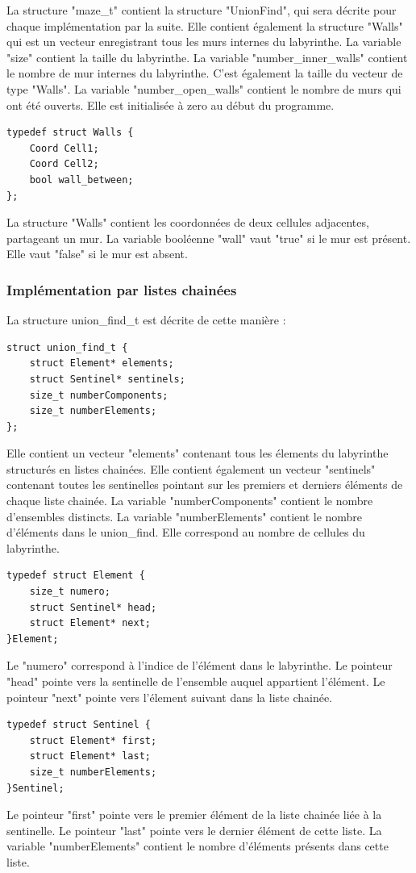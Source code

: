\documentclass[10pt]{article}
\begin{document}
La structure "maze\_t" contient la structure "UnionFind", qui sera décrite pour chaque implémentation par la suite. Elle contient également la structure "Walls" qui est un vecteur enregistrant tous les murs internes du labyrinthe. La variable "size" contient la taille du labyrinthe. La variable "number\_inner\_walls" contient le nombre de mur internes du labyrinthe. C'est également la taille du vecteur de type "Walls". La variable "number\_open\_walls" contient le nombre de murs qui ont été ouverts. Elle est initialisée à zero au début du programme.
\begin{lstlisting}[style=CStyle]
typedef struct Walls {
    Coord Cell1;
    Coord Cell2;
    bool wall_between;
};
\end{lstlisting}
La structure "Walls" contient les coordonnées de deux cellules adjacentes, partageant un mur. La variable booléenne "wall" vaut "true" si le mur est présent. Elle vaut "false" si le mur est absent.

\subsubsection{Implémentation par listes chainées}
La structure union\_find\_t est décrite de cette manière :
\begin{lstlisting}[style=CStyle]
struct union_find_t {
    struct Element* elements;
    struct Sentinel* sentinels;
    size_t numberComponents;
    size_t numberElements;
};
\end{lstlisting}
Elle contient un vecteur "elements" contenant tous les élements du labyrinthe structurés en listes chainées. Elle contient également un vecteur "sentinels" contenant toutes les sentinelles pointant sur les premiers et derniers éléments de chaque liste chainée. La variable "numberComponents" contient le nombre d'ensembles distincts. La variable "numberElements" contient le nombre d'éléments dans le union\_find. Elle correspond au nombre de cellules du labyrinthe.
\begin{lstlisting}[style=CStyle]
typedef struct Element {
    size_t numero;
    struct Sentinel* head;
    struct Element* next;
}Element;
\end{lstlisting}
Le "numero" correspond à l'indice de l'élément dans le labyrinthe. Le pointeur "head" pointe vers la sentinelle de l'ensemble auquel appartient l'élément. Le pointeur "next" pointe vers l'élement suivant dans la liste chainée.
	\begin{lstlisting}[style=CStyle]
typedef struct Sentinel {
    struct Element* first;
    struct Element* last;
    size_t numberElements;
}Sentinel;
\end{lstlisting}
Le pointeur "first" pointe vers le premier élément de la liste chainée liée à la sentinelle. Le pointeur "last" pointe vers le dernier élément de cette liste. La variable "numberElements" contient le nombre d'éléments présents dans cette liste.
\end{document}
